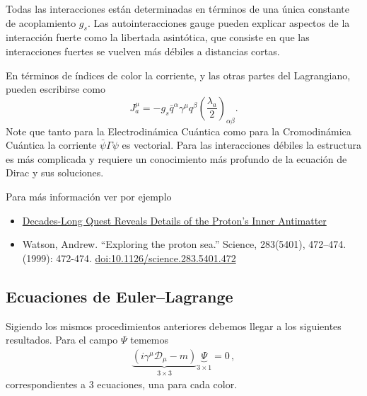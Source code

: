 Todas las interacciones están determinadas en términos de una única constante de acoplamiento $g_s$. Las autointeracciones gauge pueden explicar aspectos de la interacción fuerte como la libertada asintótica, que consiste en que las interacciones fuertes se vuelven más débiles a distancias cortas. 

En términos de índices de color la corriente, y las otras partes del Lagrangiano, pueden escribirse como
\begin{equation}
  \label{eq:223qft}
  J^\mu_a=-g_s\bar{q}^\alpha\gamma^\mu q^\beta\left(\frac{\lambda_a}{2}\right)_{\alpha\beta}.
\end{equation}
Note que tanto para la Electrodinámica Cuántica como para la Cromodinámica Cuántica la corriente $\bar{\psi}\Gamma\psi$ es vectorial. Para las interacciones débiles la estructura es más complicada y requiere un conocimiento más profundo de la ecuación de Dirac y sus soluciones.

Para más información ver por ejemplo
\begin{itemize}
\item \href{https://www.quantamagazine.org/protons-antimatter-revealed-by-decades-old-experiment-20210224/}{Decades-Long Quest Reveals Details of the Proton’s Inner Antimatter}
\item Watson, Andrew. ``Exploring the proton sea.'' Science, 283(5401), 472–474. (1999): 472-474. \href{https://drive.google.com/file/d/1qCtQQba4_qc64Hc5uR37VOnhdnMkUz0c/view?usp=sharing}{doi:10.1126/science.283.5401.472} 
\end{itemize}



\subsection{Ecuaciones de Euler--Lagrange}
\label{sec:ecuaciones-de-euler-1}
Sigiendo los mismos procedimientos anteriores debemos llegar a los siguientes resultados. Para el campo $\Psi$ tememos
\begin{align}
  \underbrace{(i\gamma^\mu\mathcal{D}_\mu-m)}_{3\times 3 }\underbrace{\Psi}_{3\times 1}=0\,,
\end{align}
correspondientes a 3 ecuaciones, una para cada color.

